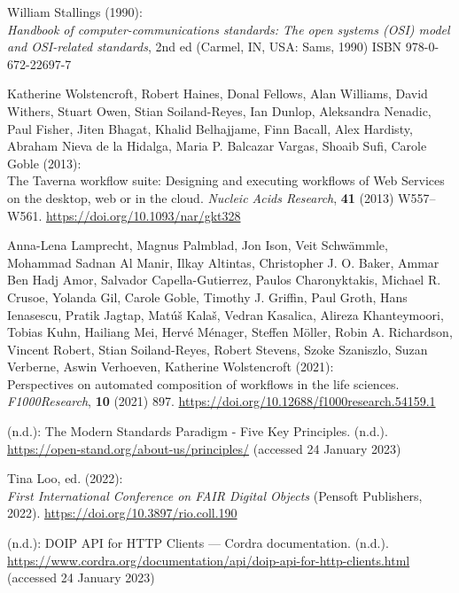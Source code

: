 \begin{thebibliography}{9}
William Stallings (1990): \\
\emph{Handbook of computer-communications
standards: {The} open systems ({OSI}) model and {OSI-related}
standards}, 2nd ed ({Carmel, IN, USA}: {Sams}, 1990) ISBN
978-0-672-22697-7

Katherine Wolstencroft, Robert Haines, Donal Fellows, Alan Williams,
David Withers, Stuart Owen, Stian Soiland-Reyes, Ian Dunlop, Aleksandra
Nenadic, Paul Fisher, Jiten Bhagat, Khalid Belhajjame, Finn Bacall, Alex
Hardisty, Abraham Nieva de la Hidalga, Maria P. Balcazar Vargas, Shoaib
Sufi, Carole Goble (2013): \\
The {Taverna} workflow suite: Designing
and executing workflows of {Web Services} on the desktop, web or in the
cloud. \emph{Nucleic Acids Research}, \textbf{41} (2013) W557--W561.
\url{https://doi.org/10.1093/nar/gkt328}

Anna-Lena Lamprecht, Magnus Palmblad, Jon Ison, Veit Schwämmle, Mohammad
Sadnan Al Manir, Ilkay Altintas, Christopher J. O. Baker, Ammar Ben Hadj
Amor, Salvador Capella-Gutierrez, Paulos Charonyktakis, Michael R.
Crusoe, Yolanda Gil, Carole Goble, Timothy J. Griffin, Paul Groth, Hans
Ienasescu, Pratik Jagtap, Matúš Kalaš, Vedran Kasalica, Alireza
Khanteymoori, Tobias Kuhn, Hailiang Mei, Hervé Ménager, Steffen Möller,
Robin A. Richardson, Vincent Robert, Stian Soiland-Reyes, Robert
Stevens, Szoke Szaniszlo, Suzan Verberne, Aswin Verhoeven, Katherine
Wolstencroft (2021): \\
Perspectives on automated composition of workflows
in the life sciences. \emph{F1000Research}, \textbf{10} (2021) 897.
\url{https://doi.org/10.12688/f1000research.54159.1}

(n.d.): The {Modern Standards Paradigm} - {Five Key Principles}. (n.d.).
\url{https://open-stand.org/about-us/principles/} (accessed 24 January
2023)

Tina Loo, ed. (2022): \\
\emph{First {International Conference} on {FAIR
Digital Objects}} ({Pensoft Publishers}, 2022).
\url{https://doi.org/10.3897/rio.coll.190}

(n.d.): {DOIP API} for {HTTP Clients} --- {Cordra} documentation.
(n.d.).
\url{https://www.cordra.org/documentation/api/doip-api-for-http-clients.html}
(accessed 24 January 2023)


\end{thebibliography}
